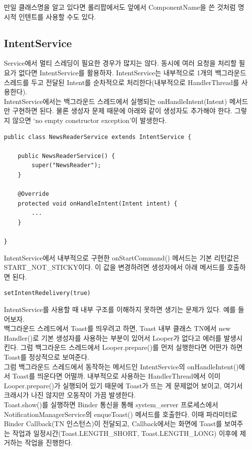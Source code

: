 만일 클래스명을 알고 있다면 롤리팝에서도 앞에서 ComponentName을 쓴 것처럼 명시적 인텐트를 사용할 수도 있다.

\subsection{IntentService}
Service에서 멀티 스레딩이 필요한 경우가 많지는 않다. 동시에 여러 요청을 처리할 필요가 없다면 IntentService를 활용하자.
IntentService는 내부적으로 1개의 백그라운드 스레드를 두고 전달된 Intent를 순차적으로 처리한다(내부적으로 HandlerThread를 사용한다).\\

IntentService에서는 백그라운드 스레드에서 실행되는 onHandleIntent(Intent) 메서드만 구현하면 된다.
물론 생성자 문제 때문에 아래와 같이 생성자도 추가해야 한다. 그렇지 않으면 `no empty constructor exception'이 발생한다. 
\begin{lstlisting}[frame=single]
public class NewsReaderService extends IntentService {

	public NewsReaderService() {
		super("NewsReader");
	}

	@Override
	protected void onHandleIntent(Intent intent) {
		...
	}
	
}	
\end{lstlisting}
IntentService에서 내부적으로 구현한 onStartCommand() 메서드는 기본 리턴값은 START\_NOT\_STICKY이다. 이 값을 변경하려면 생성자에서 아래 메서드를 호출하면 된다.
\begin{lstlisting}[frame=single]
setIntentRedelivery(true)
\end{lstlisting}

IntentService를 사용할 때 내부 구조를 이해하지 못하면 생기는 문제가 있다. 
예를 들어보자.\\

백그라운드 스레드에서 Toast를 띄우려고 하면, Toast 내부 클래스 TN에서 new Handler()로 기본 생성자를 사용하는 부분이 있어서 Looper가 없다고 에러를 발생시킨다. 그럼 백그라운드 스레드에서 Looper.prepare()를 먼저 실행한다면 어떤가 하면 Toast를 정상적으로 보여준다.\\

그럼 백그라운드 스레드에서 동작하는 메서드인 IntentService의 onHandleIntent()에서 Toast를 띄운다면 어떨까. 
내부적으로 사용하는 HandlerThread에서 이미 Looper.prepare()가 실행되어 있기 때문에 Toast가 뜨는 게 문제없어 보이고, 여기서 크래시가 나진 않지만 오동작이 가끔 발생한다.\\

Toast.show()를 실행하면 Binder 통신을 통해 system\_server 프로세스에서 NotificationManagerService의 enqueToast() 메서드를 호출한다. 이때 파라미터로 Binder Callback(TN 인스턴스)이 전달되고, Callback에서는 화면에 Toast를 보여주는 작업과 일정시간(Toast.LENGTH\_SHORT, Toast.LENGTH\_LONG) 이후에 제거하는 작업을 진행한다.\\

